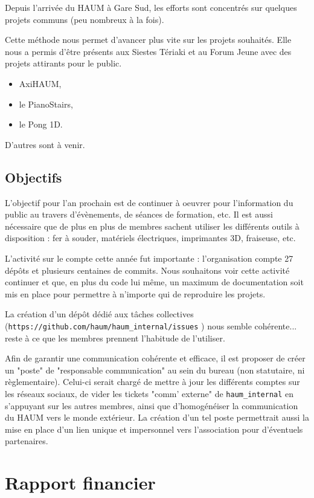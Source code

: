 \documentclass[11pt]{article}
\begin{document}
Depuis l'arrivée du HAUM à Gare Sud, les efforts sont concentrés sur quelques projets communs (peu nombreux à la fois).

Cette méthode nous permet d'avancer plus vite sur les projets souhaités. Elle nous a permis d'être présents aux Siestes Tériaki et au Forum Jeune avec des projets attirants pour le public. 
    
\begin{itemize}
    \item AxiHAUM,
    \item le PianoStairs,
    \item le Pong 1D.
\end{itemize}

D'autres sont à venir.

\subsection{Objectifs}

L'objectif pour l'an prochain est de continuer à oeuvrer pour l'information du public au travers d'évènements, de séances de formation, etc.
Il est aussi nécessaire que de plus en plus de membres sachent utiliser les différents outils à disposition : fer à souder, matériels électriques, imprimantes 3D, fraiseuse, etc.

L'activité sur le compte cette année fut importante : l'organisation compte 27 dépôts et plusieurs centaines de commits. Nous souhaitons voir cette activité continuer et que, en plus du code lui même, un maximum de documentation soit mis en place pour permettre à n'importe qui de reproduire les projets.

La création d'un dépôt dédié aux tâches collectives (\texttt{https://github.com/haum/haum\_internal/issues} ) nous semble cohérente... reste à ce que les membres prennent l'habitude de l'utiliser.

Afin de garantir une communication cohérente et efficace, il est proposer de créer un "poste" de "responsable communication" au sein du bureau (non statutaire, ni règlementaire).
Celui-ci serait chargé de mettre à jour les différents comptes sur les réseaux sociaux, de vider les tickets "comm' externe" de \texttt{haum\_internal} en s'appuyant sur les autres
membres, ainsi que d'homogénéiser la communication du HAUM vers le monde extérieur. La création d'un tel poste permettrait aussi la mise en place d'un lien unique et impersonnel vers l'association pour d'éventuels partenaires.

\section{Rapport financier}
\end{document}
